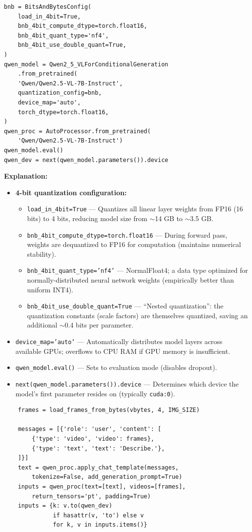 \documentclass[a4paper, 12pt]{article}
\newenvironment{explanation}{%
  \par\smallskip
  \noindent\textcolor{blue!70!black}{\textbf{Explanation:}}\\
  \noindent
}{\par\medskip}
\begin{document}
\begin{lstlisting}
bnb = BitsAndBytesConfig(
    load_in_4bit=True,
    bnb_4bit_compute_dtype=torch.float16,
    bnb_4bit_quant_type='nf4',
    bnb_4bit_use_double_quant=True,
)
qwen_model = Qwen2_5_VLForConditionalGeneration
    .from_pretrained(
    'Qwen/Qwen2.5-VL-7B-Instruct',
    quantization_config=bnb,
    device_map='auto',
    torch_dtype=torch.float16,
)
qwen_proc = AutoProcessor.from_pretrained(
    'Qwen/Qwen2.5-VL-7B-Instruct')
qwen_model.eval()
qwen_dev = next(qwen_model.parameters()).device
\end{lstlisting}

\begin{explanation}
\begin{itemize}[nosep]
  \item \textbf{4-bit quantization configuration:}
  \begin{itemize}[nosep]
    \item \texttt{load\_in\_4bit=True} --- Quantizes all linear layer weights from FP16 (16 bits) to 4 bits, reducing model size from $\sim$14 GB to $\sim$3.5 GB.
    \item \texttt{bnb\_4bit\_compute\_dtype=torch.float16} --- During forward pass, weights are dequantized to FP16 for computation (maintains numerical stability).
    \item \texttt{bnb\_4bit\_quant\_type='nf4'} --- NormalFloat4; a data type optimized for normally-distributed neural network weights (empirically better than uniform INT4).
    \item \texttt{bnb\_4bit\_use\_double\_quant=True} --- ``Nested quantization'': the quantization constants (scale factors) are themselves quantized, saving an additional $\sim$0.4 bits per parameter.
  \end{itemize}
  \item \texttt{device\_map='auto'} --- Automatically distributes model layers across available GPUs; overflows to CPU RAM if GPU memory is insufficient.
  \item \texttt{qwen\_model.eval()} --- Sets to evaluation mode (disables dropout).
  \item \texttt{next(qwen\_model.parameters()).device} --- Determines which device the model's first parameter resides on (typically \texttt{cuda:0}).
\end{itemize}
\end{explanation}

\begin{lstlisting}
    frames = load_frames_from_bytes(vbytes, 4, IMG_SIZE)

    messages = [{'role': 'user', 'content': [
        {'type': 'video', 'video': frames},
        {'type': 'text', 'text': 'Describe.'},
    ]}]
    text = qwen_proc.apply_chat_template(messages,
        tokenize=False, add_generation_prompt=True)
    inputs = qwen_proc(text=[text], videos=[frames],
        return_tensors='pt', padding=True)
    inputs = {k: v.to(qwen_dev)
              if hasattr(v, 'to') else v
              for k, v in inputs.items()}
\end{lstlisting}
\end{document}
